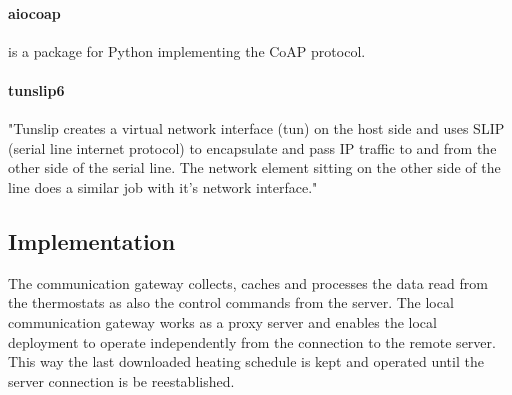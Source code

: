 \paragraph{aiocoap} is a package for Python implementing the CoAP protocol.

\paragraph{tunslip6}
"Tunslip creates a virtual network interface (tun) on the host side and uses SLIP (serial line internet protocol) to encapsulate and pass IP traffic to and from the other side of the serial line. The network element sitting on the other side of the line does a similar job with it’s network interface."


\subsection{Implementation}

The communication gateway collects, caches and processes the data read from the thermostats as also the control commands from the server. The local communication gateway works as a proxy server and enables the local deployment to operate independently from the connection to the remote server. This way the last downloaded heating schedule is kept and operated until the server connection is be reestablished. 

